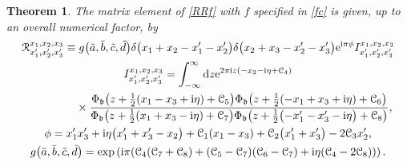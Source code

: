 \documentclass[pdftex]{sigma}
\newcommand{\bb}{{\mathfrak b}}
\newcommand{\e}{{\mathrm e}}
\numberwithin{equation}{section}
\newtheorem{Theorem}{Theorem}[section]
\begin{document}
\begin{Theorem}\label{th:Rm}
The matrix element
of \eqref{RRf} with $f$ specified in \eqref{fc} is given, up to an overall numerical factor, by
\begin{gather}
{\mathcal R}^{x_1,x_2,x_3}_{x'_1,x'_2, x'_3}
\equiv g\bigl(\tilde{a}, \tilde{b}, \tilde{c}, \tilde{d}\bigr)
\delta\bigl(x_1+x_2-x'_1-x'_2\bigr)\delta\bigl(x_2+x_3-x'_2-x'_3\bigr)\e^{ {\rm i} \pi \phi} I^{x_1,x_2,x_3}_{x'_1,x'_2, x'_3}
\label{Rm0}
\\
 I^{x_1,x_2,x_3}_{x'_1,x'_2, x'_3} =
\int_{-\infty}^\infty {\rm d}z \e^{2\pi {\rm i}z(-x_2-{\rm i}\eta+{\mathcal C}_4)}
\nonumber \\
\phantom{ I^{x_1,x_2,x_3}_{x'_1,x'_2, x'_3} =}{} \times \frac{\Phi_\bb\bigl(z+\frac{1}{2}(x_1-x_3+{\rm i}\eta)+{\mathcal C}_5\bigr)
\Phi_\bb\bigl(z+\frac{1}{2}(-x_1+x_3+{\rm i}\eta)+{\mathcal C}_6\bigr)}
{\Phi_\bb\bigl(z+\frac{1}{2}(x_1+x_3-{\rm i}\eta)+{\mathcal C}_7\bigr)
\Phi_\bb\bigl(z+\frac{1}{2}\bigl(-x'_1-x'_3-{\rm i}\eta\bigr)+{\mathcal C}_8\bigr)},
\label{Rm1}
\\
\phi = x'_1x'_3+{\rm i}\eta\bigl(x'_1+x'_3-x_2\bigr)+{\mathcal C}_1(x_1-x_3)+{\mathcal C}_2\bigl(x'_1+x'_3\bigr)-2{\mathcal C}_3x'_2,
\label{Rm2}\\
g\bigl(\tilde{a}, \tilde{b}, \tilde{c}, \tilde{d}\bigr) =
\exp\left({\rm i}\pi(\mathcal{C}_4(\mathcal{C}_7+\mathcal{C}_8)
+(\mathcal{C}_5-\mathcal{C}_7)(\mathcal{C}_6-\mathcal{C}_7)
+ {\rm i}\eta(\mathcal{C}_4-2\mathcal{C}_8))\right).\nonumber
\end{gather}
\end{Theorem}
\end{document}
